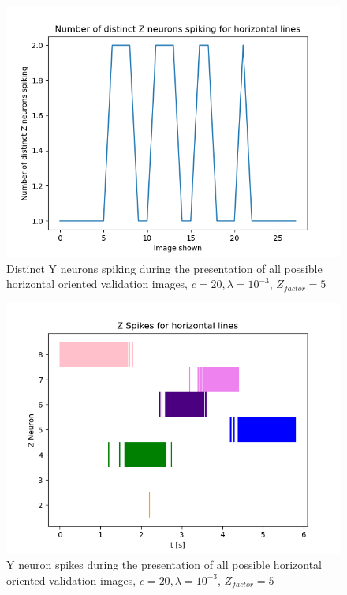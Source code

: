 \begin{figure}
  \includegraphics[width=\linewidth]{figures/horvert/horvert_c20_3_Zfactor5_horizontalDistinctZ.png}
  \caption{Distinct Y neurons spiking during the presentation of all possible horizontal oriented validation images, $c = 20, \lambda = 10^{-3}$, $Z_{factor} = 5$}
  \label{fig:horvert_c20_3_Zfactor5_horizontalDistinctZ}
\end{figure}
\begin{figure}
  \includegraphics[width=\linewidth]{figures/horvert/horvert_c20_3_Zfactor5_horizontalZSpikes.png}
  \caption{Y neuron spikes during the presentation of all possible horizontal oriented validation images, $c = 20, \lambda = 10^{-3}$, $Z_{factor} = 5$}
  \label{fig:horvert_c20_3_Zfactor5_horizontalZSpikes}
\end{figure}


